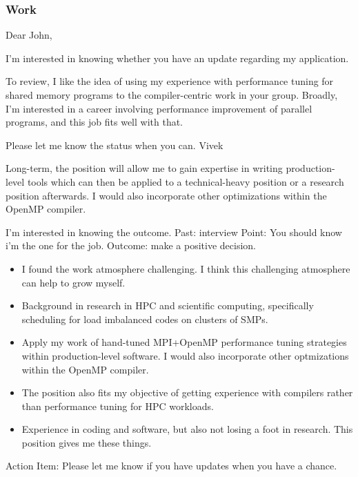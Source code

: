 \begin{frame} 
\frametitle{Work}
Dear John,

I'm interested in knowing whether you have an update regarding my
application.

To review, I like the idea of using my experience with performance tuning 
for shared memory programs to the compiler-centric work in your
group. Broadly, I'm interested in a career involving performance improvement of
parallel programs, and this job fits well with that.

Please let me know the status when you can. 
Vivek

Long-term, the position will allow me to gain expertise in writing
production-level tools which can then be applied to a technical-heavy
position or a research position afterwards.
I would also incorporate other optimizations within the OpenMP
compiler.

I'm interested in knowing the outcome. 
Past: interview
Point: You should know i'm the one for the job.
Outcome: make a positive decision. 
\begin{itemize}
\tiny \item \tiny I found the work atmosphere challenging. I think
this challenging atmosphere can help to grow myself.
\tiny \item \tiny Background in research in HPC and scientific
computing, specifically scheduling for load imbalanced codes on 
clusters of SMPs. 
\item \tiny Apply my work of hand-tuned MPI+OpenMP performance tuning strategies within production-level software. I would also
  incorporate other optmizations within the OpenMP compiler.
\item \tiny The position also fits my objective of getting experience with
compilers rather than performance tuning for HPC workloads.
\item \tiny Experience in coding and software, but also not losing a
  foot in research. This position gives me these things. 
\end{itemize} 
Action Item: Please let me know if you have updates when you have a
chance. 
\end{frame} 

